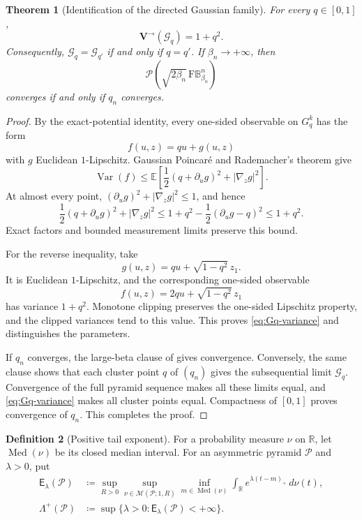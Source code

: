 \documentclass{amsart}
\numberwithin{equation}{section}
\theoremstyle{plain}
\newtheorem{theorem}{Theorem}[section]
\theoremstyle{definition}
\newtheorem{definition}[theorem]{Definition}
\theoremstyle{remark}
\newcommand{\R}{\mathbb R}
\newcommand{\BetaBall}{\mathrm F\mathbb B^n_{\beta_n}}
\newcommand{\Pyr}{\mathcal P}
\newcommand{\Var}{\operatorname{Var}}
\begin{document}
\begin{theorem}[Identification of the directed Gaussian family]\label{thm:Gq-classification}
For every $q\in[0,1]$,
\begin{equation}\label{eq:Gq-variance} \mathbf{V}^{\to}(\mathcal G_q)=1+q^2. \end{equation}
Consequently, $\mathcal G_q=\mathcal G_{q'}$ if and only if $q=q'$.  If $\beta_n\to+\infty$, then
\[ \Pyr(\sqrt{2\beta_n}\,\BetaBall) \]
converges if and only if $q_n$ converges.
\end{theorem}

\begin{proof}
By the exact-potential identity, every one-sided observable on $G_q^k$ has the form
\[ f(u,z)=qu+g(u,z) \]
with $g$ Euclidean $1$-Lipschitz.  Gaussian Poincar\'e and Rademacher's theorem give
\[ \Var(f) \le\mathbb E\left[\frac12(q+\partial_ug)^2+|\nabla_zg|^2\right]. \]
At almost every point, $(\partial_ug)^2+|\nabla_zg|^2\le1$, and hence
\[ \frac12(q+\partial_ug)^2+|\nabla_zg|^2 \le1+q^2-\frac12(\partial_ug-q)^2 \le1+q^2. \]
Exact factors and bounded measurement limits preserve this bound.

For the reverse inequality, take
\[ g(u,z)=qu+\sqrt{1-q^2}\,z_1. \]
It is Euclidean $1$-Lipschitz, and the corresponding one-sided observable
\[ f(u,z)=2qu+\sqrt{1-q^2}\,z_1 \]
has variance $1+q^2$.  Monotone clipping preserves the one-sided Lipschitz property, and the clipped variances tend to this value.  This proves \eqref{eq:Gq-variance} and distinguishes the parameters.

If $q_n$ converges, the large-beta clause of  gives convergence.  Conversely, the same clause shows that each cluster point $q$ of $(q_n)$ gives the subsequential limit $\mathcal G_q$.  Convergence of the full pyramid sequence makes all these limits equal, and \eqref{eq:Gq-variance} makes all cluster points equal.  Compactness of $[0,1]$ proves convergence of $q_n$.  This completes the proof.
\end{proof}

\begin{definition}[Positive tail exponent]\label{def:tail-exponent}
For a probability measure $\nu$ on $\R$, let $\operatorname{Med}(\nu)$ be its closed median interval.  For an asymmetric pyramid $\mathcal P$ and $\lambda>0$, put
\begin{align}
 \mathsf E_\lambda(\mathcal P)
 &\coloneqq\sup_{R>0}\sup_{\nu\in\mathcal M(\mathcal P;1,R)}
 \inf_{m\in\operatorname{Med}(\nu)}
 \int_\R e^{\lambda(t-m)_+}\,d\nu(t),
 \label{eq:tail-functional}\\
 \Lambda^+(\mathcal P)
 &\coloneqq\sup\{\lambda>0\colon\mathsf E_\lambda(\mathcal P)<+\infty\}.
 \label{eq:tail-exponent}
\end{align}
\end{definition}
\end{document}
